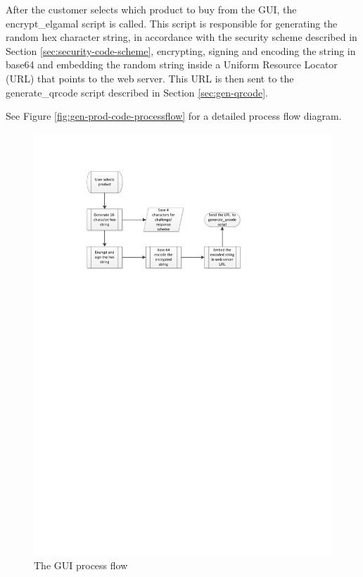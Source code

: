 After the customer selects which product to buy from the GUI, the
encrypt\_elgamal script is called. This script is responsible for generating the
random hex character string, in accordance with the security scheme described in
Section \ref{sec:security-code-scheme}, encrypting, signing and encoding the
string in base64 and embedding the random string inside a Uniform
Resource Locator (URL) that points to the web server. This URL is then sent to
the generate\_qrcode script described in Section \ref{sec:gen-qrcode}.

See Figure \ref{fig:gen-prod-code-processflow} for a detailed process flow
diagram.

\begin{figure}
 \centering 
 \includegraphics[clip=true, trim
 = 0 550 0 70, scale=0.7]{generate_product_code_processflow}
 \caption{The GUI process flow}
 \label{fig:gen-prod-code-processflow.}
\end{figure}

